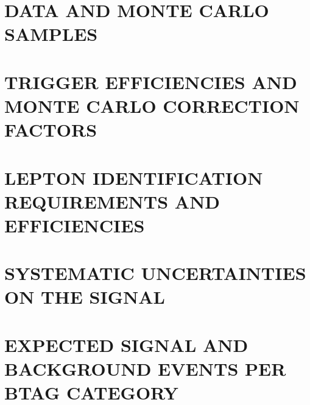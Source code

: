\chapter{DATA AND MONTE CARLO SAMPLES}
\label{sec:tablessamples}






\chapter{TRIGGER EFFICIENCIES AND MONTE CARLO CORRECTION FACTORS}
\label{sec:hltsf}


\chapter{LEPTON IDENTIFICATION REQUIREMENTS AND EFFICIENCIES}
\label{sec:datamcsf}



\chapter{SYSTEMATIC UNCERTAINTIES ON THE SIGNAL}
\label{sec:appsyst}





%

%

\chapter{EXPECTED SIGNAL AND BACKGROUND EVENTS PER BTAG CATEGORY}
\label{sec:numberevents}


